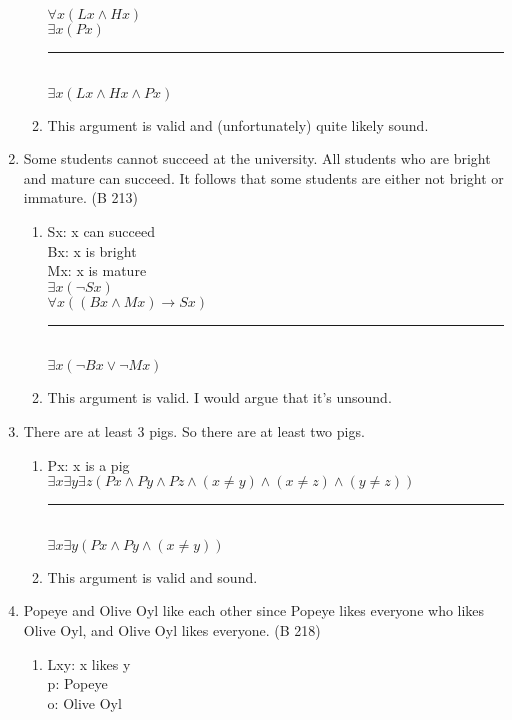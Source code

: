 \documentclass{article}
\begin{document}
\begin{enumerate}
\begin{enumerate}
                        $\forall x(Lx \land Hx)$\\
                        $\exists x(Px)$\\
                        \rule{15em}{.5pt}\\
                        $\exists x(Lx \land Hx \land Px)$
                  \item This argument is valid and (unfortunately) quite likely sound.
            \end{enumerate}
      \item Some students cannot succeed at the university. All students who are bright and mature can succeed. It follows that some students are either not bright or immature. (B 213)
            \begin{enumerate}
                  \item Sx: x can succeed\\
                        Bx: x is bright\\
                        Mx: x is mature\\

                        $\exists x(\neg Sx)$\\
                        $\forall x((Bx \land Mx) \to Sx)$\\
                        \rule{15em}{.5pt}\\
                        $\exists x(\neg Bx \lor \neg Mx)$
                  \item This argument is valid. I would argue that it's unsound.
            \end{enumerate}
      \item There are at least 3 pigs. So there are at least two pigs.
            \begin{enumerate}
                  \item Px: x is a pig\\
                        $\exists x \exists y \exists z (Px \land Py \land Pz \land (x \neq y) \land (x \neq z) \land (y \neq z))$\\
                        \rule{15em}{.5pt}\\
                        $\exists x \exists y (Px \land Py \land (x \neq y))$
                  \item This argument is valid and sound.
            \end{enumerate}
      \item Popeye and Olive Oyl like each other since Popeye likes everyone who likes Olive Oyl, and Olive Oyl likes everyone. (B 218)
            \begin{enumerate}
                  \item Lxy: x likes y\\
                        p: Popeye\\
                        o: Olive Oyl\\


\end{enumerate}
\end{enumerate}
\end{document}
